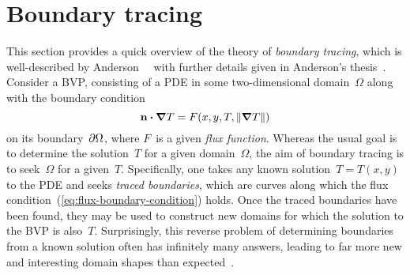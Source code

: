 \section{Boundary tracing}

This section provides a quick overview of
the theory of \emph{boundary tracing},
which is well-described by
Anderson~\etal~\cite{anderson-2007-boundary-tracing-i-theory}
with further details given in
Anderson's thesis~\cite{anderson-2002-thesis-boundary-tracing-pdes}.
Consider a BVP, consisting of
a PDE in some two-dimensional domain~$\Omega$
along with the boundary condition
\begin{equation}
  \mathop{}\!\boldsymbol{\mathrm{n}} \boldsymbol{\cdot} \mathop{}\!\boldsymbol{\mathrm{\nabla}} T = F (x, y, T, \lVert\mathop{}\!\boldsymbol{\mathrm{\nabla}} T\rVert)
  \label{eq:flux-boundary-condition}
\end{equation}
on its boundary~$\mathop{}\!\partial\Omega$,
where $F$~is a given \emph{flux function}.
Whereas the usual goal is
to determine the solution~$T$ for a given domain~$\Omega$,
the aim of boundary tracing is
to seek~$\Omega$ for a given~$T$.
Specifically, one takes any known solution~$T = T (x, y)$ to the PDE
and seeks \emph{traced boundaries}, which are curves
along which the flux condition~(\ref{eq:flux-boundary-condition}) holds.
Once the traced boundaries have been found,
they may be used to construct new domains
for which the solution to the BVP is also~$T$.
Surprisingly, this reverse problem
of determining boundaries from a known solution
often has infinitely many answers,
leading to far more new and interesting domain shapes
than expected~\cite{anderson-2007-boundary-tracing-ii-applications}.
